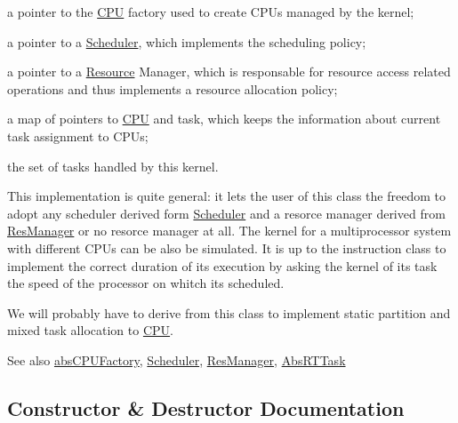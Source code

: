 \begin{DoxyItemize}
\item a pointer to the \hyperlink{classRTSim_1_1CPU}{C\+PU} factory used to create C\+P\+Us managed by the kernel;
\item a pointer to a \hyperlink{classRTSim_1_1Scheduler}{Scheduler}, which implements the scheduling policy;
\item a pointer to a \hyperlink{classRTSim_1_1Resource}{Resource} Manager, which is responsable for resource access related operations and thus implements a resource allocation policy;
\item a map of pointers to \hyperlink{classRTSim_1_1CPU}{C\+PU} and task, which keeps the information about current task assignment to C\+P\+Us;
\item the set of tasks handled by this kernel.
\end{DoxyItemize}

This implementation is quite general\+: it lets the user of this class the freedom to adopt any scheduler derived form \hyperlink{classRTSim_1_1Scheduler}{Scheduler} and a resorce manager derived from \hyperlink{classRTSim_1_1ResManager}{Res\+Manager} or no resorce manager at all. The kernel for a multiprocessor system with different C\+P\+Us can be also be simulated. It is up to the instruction class to implement the correct duration of its execution by asking the kernel of its task the speed of the processor on whitch it\textquotesingle{}s scheduled.

We will probably have to derive from this class to implement static partition and mixed task allocation to \hyperlink{classRTSim_1_1CPU}{C\+PU}.

\begin{DoxySeeAlso}{See also}
\hyperlink{classRTSim_1_1absCPUFactory}{abs\+C\+P\+U\+Factory}, \hyperlink{classRTSim_1_1Scheduler}{Scheduler}, \hyperlink{classRTSim_1_1ResManager}{Res\+Manager}, \hyperlink{classRTSim_1_1AbsRTTask}{Abs\+R\+T\+Task} 
\end{DoxySeeAlso}


\subsection{Constructor \& Destructor Documentation}
